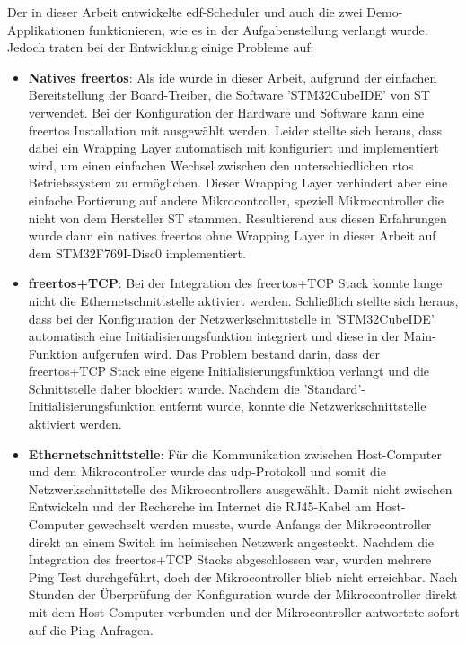 \documentclass[../EDF Master Thesis.tex]{subfiles}
\begin{document}
    Der in dieser Arbeit entwickelte \ac{edf}-Scheduler und auch die zwei Demo-Applikationen funktionieren, wie es in der Aufgabenstellung verlangt wurde.
    Jedoch traten bei der Entwicklung einige Probleme auf:
    \begin{itemize}
        \item \textbf{Natives \ac{freertos}}: Als \ac{ide} wurde in dieser Arbeit, aufgrund der einfachen Bereitstellung der Board-Treiber, die Software 'STM32CubeIDE' von ST verwendet.
            Bei der Konfiguration der Hardware und Software kann eine \ac{freertos} Installation mit ausgewählt werden.
            Leider stellte sich heraus, dass dabei ein Wrapping Layer automatisch mit konfiguriert und implementiert wird, um einen einfachen Wechsel zwischen den unterschiedlichen \ac{rtos} Betriebssystem zu ermöglichen.
            Dieser Wrapping Layer verhindert aber eine einfache Portierung auf andere Mikrocontroller, speziell Mikrocontroller die nicht von dem Hersteller ST stammen.
            Resultierend aus diesen Erfahrungen wurde dann ein natives \ac{freertos} ohne Wrapping Layer in dieser Arbeit auf dem STM32F769I-Disc0 implementiert.
        \item \textbf{\ac{freertos}+TCP}: Bei der Integration des \ac{freertos}+TCP Stack konnte lange nicht die Ethernetschnittstelle aktiviert werden.
            Schließlich stellte sich heraus, dass bei der Konfiguration der Netzwerkschnittstelle in 'STM32CubeIDE' automatisch eine Initialisierungsfunktion integriert und diese in der Main-Funktion aufgerufen wird.
            Das Problem bestand darin, dass der \ac{freertos}+TCP Stack eine eigene Initialisierungsfunktion verlangt und die Schnittstelle daher blockiert wurde.
            Nachdem die 'Standard'-Initialisierungsfunktion entfernt wurde, konnte die Netzwerkschnittstelle aktiviert werden.
        \item \textbf{Ethernetschnittstelle}: Für die Kommunikation zwischen Host-Computer und dem Mikrocontroller wurde das \ac{udp}-Protokoll und somit die Netzwerkschnittstelle des Mikrocontrollers ausgewählt.
            Damit nicht zwischen Entwickeln und der Recherche im Internet die RJ45-Kabel am Host-Computer gewechselt werden musste, wurde Anfangs der Mikrocontroller direkt an einem Switch im heimischen Netzwerk angesteckt.
            Nachdem die Integration des \ac{freertos}+TCP Stacks abgeschlossen war, wurden mehrere Ping Test durchgeführt, doch der Mikrocontroller blieb nicht erreichbar.
            Nach Stunden der Überprüfung der Konfiguration wurde der Mikrocontroller direkt mit dem Host-Computer verbunden und der Mikrocontroller antwortete sofort auf die Ping-Anfragen.

\end{itemize}
\end{document}
